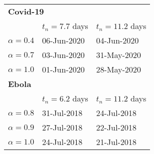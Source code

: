 \begin{tabular}{lll} 
\hline
\multicolumn{3}{l}{ \bf Covid-19} \\ 
 &  $t_n=7.7$ days & $t_n=11.2$ days \\ 
$\alpha=0.4$ & 06-Jun-2020 & 04-Jun-2020 \\ 
 $\alpha=0.7$ & 03-Jun-2020 & 31-May-2020 \\ 
 $\alpha=1.0$ & 01-Jun-2020 & 28-May-2020 \\ 
 \hline
\multicolumn{3}{l}{ \bf Ebola} \\ 
 &  $t_n=6.2$ days & $t_n=11.2$ days \\ 
$\alpha=0.8$ & 31-Jul-2018 & 24-Jul-2018 \\ 
 $\alpha=0.9$ & 27-Jul-2018 & 22-Jul-2018 \\ 
 $\alpha=1.0$ & 24-Jul-2018 & 21-Jul-2018 \\ 
 \hline
\end{tabular} 
